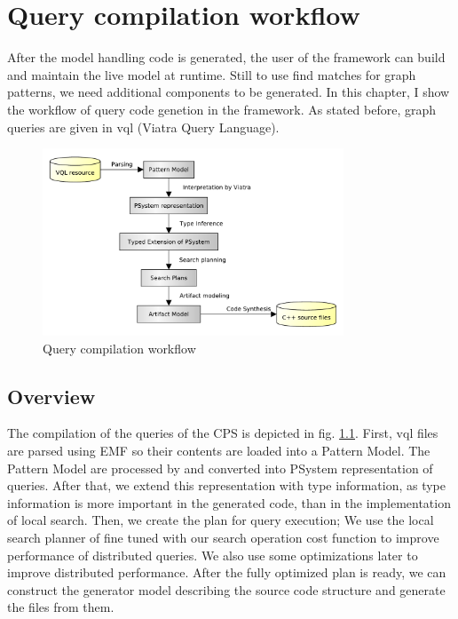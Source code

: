 

\chapter{Query compilation workflow}

After the model handling code is generated, the user of the framework can build and maintain the live model at runtime. 
Still to use find matches for graph patterns, we need additional components to be generated. 
In this chapter, I show the workflow of query code genetion in the framework. 
As stated before, graph queries are given in vql (Viatra Query Language).


\begin{figure}[H]
	\begin{center}
		\includegraphics[width=0.8\textwidth]{figures/query-compilation-workflow.pdf}
		\caption{Query compilation workflow}
		\label{figure:query-compile-workflow}
	\end{center}
\end{figure}


\section{Overview}

The compilation of the queries of the CPS is depicted in fig. \ref{figure:query-compile-workflow}. 
First, vql files are parsed using EMF so their contents are loaded into a Pattern Model.
The Pattern Model are processed by \viatra{} and converted into PSystem representation of queries.
After that, we extend this representation with type information, as type information is more important in the \cpp{} generated code, than in the \viatra implementation of local search.
Then, we create the plan for query execution; We use the local search planner of \viatra{} fine tuned with our search operation cost function to improve performance of distributed queries. 
We also use some optimizations later to improve distributed performance. 
After the fully optimized plan is ready, we can construct the generator model describing the source code structure and generate the \cpp{} files from them.




